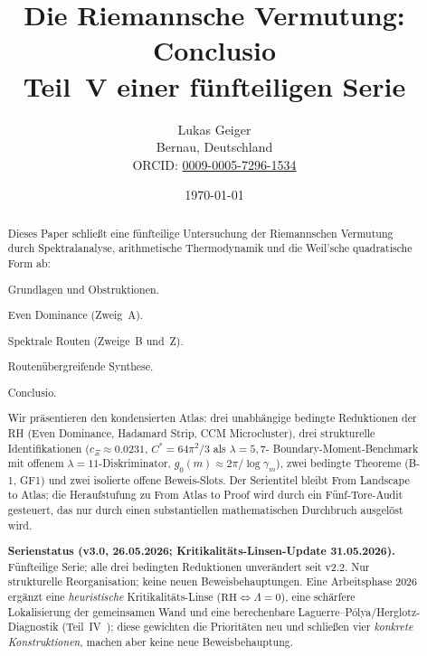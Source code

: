 \documentclass[12pt,a4paper]{article}
\title{Die Riemannsche Vermutung: Conclusio\\[4pt]
\large Teil~V einer fünfteiligen Serie}
\author{Lukas Geiger\\
\small Bernau, Deutschland\\
\small ORCID: \href{https://orcid.org/0009-0005-7296-1534}{0009-0005-7296-1534}}
\date{\today}
\theoremstyle{definition}
\theoremstyle{remark}
\begin{document}
\overfullrule=0pt
\maketitle

\begin{abstract}\footnotesize
Dieses Paper schließt eine fünfteilige Untersuchung der Riemannschen
Vermutung durch Spektralanalyse, arithmetische Thermodynamik und die
Weil'sche quadratische Form ab:
\begin{description}[font=\bfseries,leftmargin=2em]
  \item[Teil~I \cite{Geiger2026partI}:] Grundlagen und Obstruktionen.
  \item[Teil~II \cite{Geiger2026partII}:] Even Dominance (Zweig~A).
  \item[Teil~III \cite{Geiger2026partIII}:] Spektrale Routen
    (Zweige~B und~Z).
  \item[Teil~IV \cite{Geiger2026partIV}:] Routenübergreifende Synthese.
  \item[Teil~V (dieses Paper):] Conclusio.
\end{description}

\noindent Wir präsentieren den kondensierten Atlas: drei unabhängige
bedingte Reduktionen der RH (Even Dominance, Hadamard Strip, CCM
Microcluster), drei strukturelle Identifikationen
($c_\Xi \approx 0.0231$, $C^* = 64\pi^2/3$ als $\lambda=5,7$-
Boundary-Moment-Benchmark mit offenem $\lambda=11$-Diskriminator,
$g_0(m) \approx 2\pi/\log\gamma_m$), zwei
bedingte Theoreme (B-1, GF1) und zwei
isolierte offene Beweis-Slots. Der Serientitel bleibt \glqq From
Landscape to Atlas\grqq{}; die Heraufstufung zu \glqq From Atlas to
Proof\grqq{} wird durch ein Fünf-Tore-Audit gesteuert, das nur durch
einen substantiellen mathematischen Durchbruch ausgelöst wird.

\medskip\noindent
\textbf{Serienstatus (v3.0, 26.05.2026; Kritikalitäts-Linsen-Update 31.05.2026).}
Fünfteilige Serie; alle drei bedingten Reduktionen unverändert seit v2.2.
Nur strukturelle Reorganisation; keine neuen Beweisbehauptungen. Eine Arbeitsphase
2026 ergänzt eine \emph{heuristische} Kritikalitäts-Linse
($\mathrm{RH}\Leftrightarrow\Lambda=0$), eine schärfere Lokalisierung der
gemeinsamen Wand und eine berechenbare Laguerre--P\'olya/Herglotz-Diagnostik
(Teil~IV~\cite{Geiger2026partIV}); diese gewichten die Prioritäten neu und schließen
vier \emph{konkrete Konstruktionen}, machen aber keine neue Beweisbehauptung.
\end{abstract}
\end{document}
